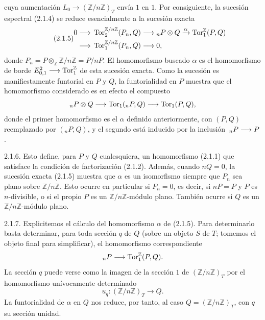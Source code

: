 
cuya aumentación
$L_0\longrightarrow(\mathbb Z/n\mathbb Z)_T$ envía $1$ en $1$.
Por consiguiente, la sucesión espectral (2.1.4) se reduce
esencialmente a la sucesión exacta
\begin{equation}\tag{2.1.5}
\begin{split}
0\longrightarrow{}&
 \uTor^{\mathbb Z/n\mathbb Z}_2(P_n,Q)
 \longrightarrow{}_nP\otimes Q
 \xrightarrow{\alpha}\uTor^{\mathbb Z}_1(P,Q)\\
\longrightarrow{}&
 \uTor^{\mathbb Z/n\mathbb Z}_1(P_n,Q)
 \longrightarrow0,
\end{split}
\end{equation}
donde $P_n=P\otimes_{\mathbb Z}\mathbb Z/n\mathbb Z=P/nP$.
El homomorfismo buscado $\alpha$ es el homomorfismo de borde
$E^2_{0,1}\longrightarrow\uTor^{\mathbb Z}_1$ de esta sucesión
exacta. Como la sucesión es manifiestamente funtorial en $P$ y $Q$,
la funtorialidad en $P$ muestra que el homomorfismo considerado es en
efecto el compuesto
\[
 {}_nP\otimes Q
 \longrightarrow\uTor_1({}_nP,Q)
 \longrightarrow\uTor_1(P,Q),
\]
donde el primer homomorfismo es el $\alpha$ definido anteriormente,
con $(P,Q)$ reemplazado por $({}_nP,Q)$, y el segundo está inducido
por la inclusión $\,{}_nP\longrightarrow\sisi{Q}{P}$.

2.1.6. Esto define, para $P$ y $Q$ cualesquiera, un homomorfismo
(2.1.1) que satisface la condición de factorización (2.1.2). Además,
cuando $nQ=0$, la sucesión exacta (2.1.5) muestra que $\alpha$ es un
isomorfismo siempre que $P_n$ sea plano sobre
$\mathbb Z/n\mathbb Z$. Esto ocurre en particular si $P_n=0$, es
decir, si $nP=P$ y $P$ es $n$-divisible, o si el propio $P$ es un
$\mathbb Z/n\mathbb Z$-módulo plano. También ocurre si $Q$ es un
$\mathbb Z/n\mathbb Z$-módulo plano.

2.1.7. Explicitemos el cálculo del homomorfismo $\alpha$ de (2.1.5).
Para determinarlo basta determinar, para toda sección $q$ de $Q$
(sobre un objeto $S$ de $T$; tomemos el objeto final para simplificar),
el homomorfismo correspondiente
\[
 {}_nP\longrightarrow\uTor^{\mathbb Z}_1(P,Q).
\]
La sección $q$ puede verse como la imagen de la sección $1$ de
$(\mathbb Z/n\mathbb Z)_T$ por el homomorfismo unívocamente
determinado
\[
 u_q:(\mathbb Z/n\mathbb Z)_T\longrightarrow Q.
\]
La funtorialidad de $\alpha$ en $Q$ nos reduce, por tanto, al caso
$Q=(\mathbb Z/n\mathbb Z)_T$, con $q$ su sección unidad.



